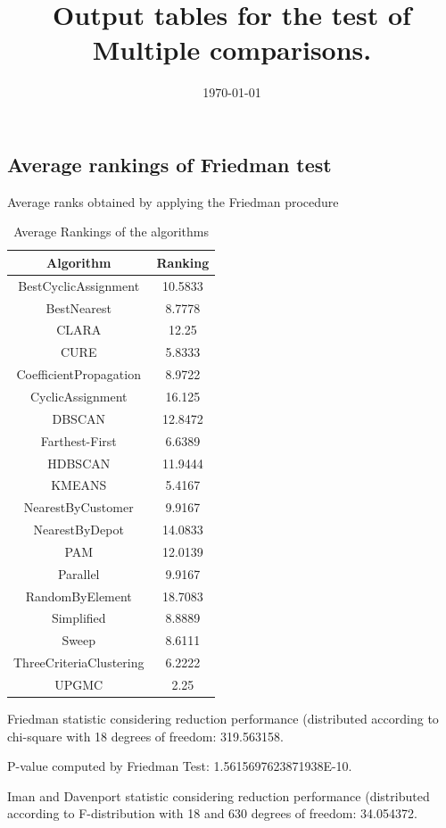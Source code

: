 \documentclass[a4paper,10pt]{article}
\title{Output tables for the test of Multiple comparisons.}
\author{}
\date{\today}
\begin{document}
\begin{landscape}
\pagestyle{empty}
\maketitle
\thispagestyle{empty}
\section{Average rankings of Friedman test}



Average ranks obtained by applying the Friedman procedure

\begin{table}[!htp]
\centering
\begin{tabular}{|c|c|}\hline
Algorithm&Ranking\\\hline
BestCyclicAssignment & 10.5833\\
BestNearest & 8.7778\\
CLARA & 12.25\\
CURE & 5.8333\\
CoefficientPropagation & 8.9722\\
CyclicAssignment & 16.125\\
DBSCAN & 12.8472\\
Farthest-First & 6.6389\\
HDBSCAN & 11.9444\\
KMEANS & 5.4167\\
NearestByCustomer & 9.9167\\
NearestByDepot & 14.0833\\
PAM & 12.0139\\
Parallel & 9.9167\\
RandomByElement & 18.7083\\
Simplified & 8.8889\\
Sweep & 8.6111\\
ThreeCriteriaClustering & 6.2222\\
UPGMC & 2.25\\
\hline
\end{tabular}
\caption{Average Rankings of the algorithms}
\end{table}

Friedman statistic considering reduction performance (distributed according to chi-square with 18 degrees of freedom: 319.563158.

P-value computed by Friedman Test: 1.5615697623871938E-10.\newline

Iman and Davenport statistic considering reduction performance (distributed according to F-distribution with 18 and 630 degrees of freedom: 34.054372.


\end{landscape}
\end{document}
